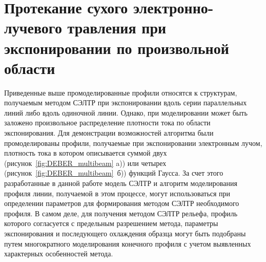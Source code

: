 \section{Протекание сухого электронно-лучевого травления при экспонировании по произвольной области}

Приведенные выше промоделированные профили относятся к структурам, получаемым методом СЭЛТР при экспонировании вдоль серии параллельных линий либо вдоль одиночной линии.
Однако, при моделировании может быть заложено произвольное распределение плотности тока по области экспонирования.
Для демонстрации возможностей алгоритма были промоделированы профили, получаемые при экспонировании электронным лучом, плотность тока в котором описывается суммой двух (рисунок~\ref{fig:DEBER_multibeam} a)) или четырех (рисунок~\ref{fig:DEBER_multibeam}~б)) функций Гаусса.
За счет этого разработанные в данной работе модель СЭЛТР и алгоритм моделирования профиля линии, получаемой в этом процессе, могут использоваться при определении параметров для формирования методом СЭЛТР необходимого профиля.
В самом деле, для получения методом СЭЛТР рельефа, профиль которого согласуется с предельным разрешением метода, параметры экспонирования и последующего охлаждения образца могут быть подобраны путем многократного моделирования конечного профиля с учетом выявленных характерных особенностей метода.

